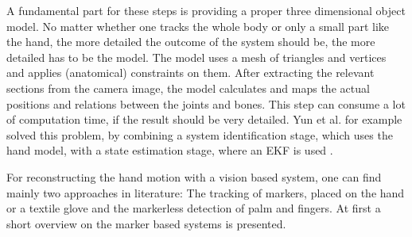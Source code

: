A fundamental part for these steps is providing a proper three dimensional object model. No matter whether one tracks the whole body or only a small part like the hand, the more detailed the outcome of the system should be, the more detailed has to be the model. The model uses a mesh of triangles and vertices and applies (anatomical) constraints on them. After extracting the relevant sections from the camera image, the model calculates and maps the actual positions and relations between the joints and bones. This step can consume a lot of computation time, if the result should be very detailed. Yun et al. for example solved this problem, by combining a system identification stage, which uses the hand model, with a state estimation stage, where an \ac{EKF} is used \cite{yun2013accurate}.

For reconstructing the hand motion with a vision based system, one can find mainly two approaches in literature: The tracking of markers, placed on the hand or a textile glove and the markerless detection of palm and fingers. At first a short overview on the marker based systems is presented. \\
